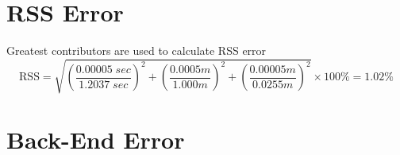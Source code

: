 \section*{RSS Error}

\begin{center}
  \noindent Greatest contributors are used to calculate RSS error
  \begin{equation*}
      \text{RSS} = \sqrt{ \left( \frac{0.00005 \; sec}{1.2037 \; sec} \right)^2 
      + \left( \frac{0.0005 m}{1.000 m} \right)^2
      + \left( \frac{0.00005 m}{0.0255 m} \right)^2} \times 100\% = 1.02\%
  \end{equation*}
\end{center}

\section*{Back-End Error}

